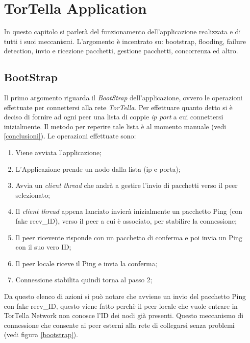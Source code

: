 \chapter{TorTella Application}
In questo capitolo si parlerà del funzionamento dell'applicazione realizzata e di tutti i suoi meccanismi. L'argomento è incentrato su: bootstrap, flooding, failure detection, invio e ricezione pacchetti, gestione pacchetti, concorrenza ed altro.
\section{BootStrap}
Il primo argomento riguarda il \textit{BootStrap} dell'applicazione, ovvero le operazioni effettuate per connettersi alla rete \textit{TorTella}. Per effettuare quanto detto si è deciso di fornire ad ogni peer una lista di coppie \textit{ip port} a cui connettersi inizialmente. Il metodo per reperire tale lista è al momento manuale (vedi \ref{conclusioni}). Le operazioni effettuate sono:
\begin{enumerate}
\item Viene avviata l'applicazione;
\item L'Applicazione prende un nodo dalla lista (ip e porta);
\item Avvia un \textit{client thread} che andrà a gestire l'invio di pacchetti verso il peer selezionato;
\item Il \textit{client thread} appena lanciato invierà inizialmente un pacchetto Ping (con fake recv\_ID), verso il peer a cui è associato, per stabilire la connessione;
\item Il peer ricevente risponde con un pacchetto di conferma e poi invia un Ping con il suo vero ID;
\item Il peer locale riceve il Ping e invia la conferma;
\item Connessione stabilita quindi torna al passo 2;
\end{enumerate}
Da questo elenco di azioni si può notare che avviene un invio del pacchetto Ping con fake recv\_ID, questo viene fatto perchè il peer locale che vuole entrare in TorTella Network non conosce l'ID dei nodi già presenti. Questo meccanismo di connessione che consente ai peer esterni alla rete di collegarsi senza problemi (vedi figura \ref{bootstrap}).
